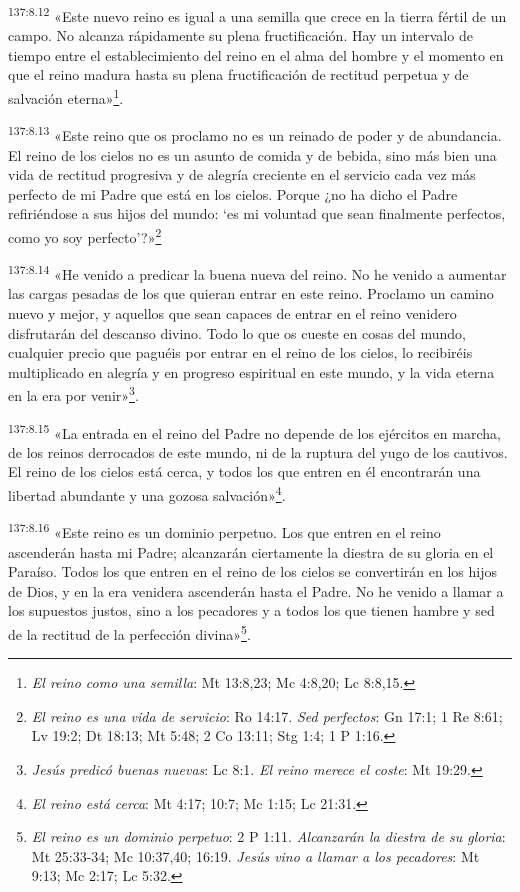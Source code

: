 \par 
\textsuperscript{137:8.12} «Este nuevo reino es igual a una semilla que crece en la tierra fértil de un campo. No alcanza rápidamente su plena fructificación. Hay un intervalo de tiempo entre el establecimiento del reino en el alma del hombre y el momento en que el reino madura hasta su plena fructificación de rectitud perpetua y de salvación eterna»\footnote{\textit{El reino como una semilla}: Mt 13:8,23; Mc 4:8,20; Lc 8:8,15.}.

\par 
\textsuperscript{137:8.13} «Este reino que os proclamo no es un reinado de poder y de abundancia. El reino de los cielos no es un asunto de comida y de bebida, sino más bien una vida de rectitud progresiva y de alegría creciente en el servicio cada vez más perfecto de mi Padre que está en los cielos. Porque ¿no ha dicho el Padre refiriéndose a sus hijos del mundo: `es mi voluntad que sean finalmente perfectos, como yo soy perfecto'?»\footnote{\textit{El reino es una vida de servicio}: Ro 14:17. \textit{Sed perfectos}: Gn 17:1; 1 Re 8:61; Lv 19:2; Dt 18:13; Mt 5:48; 2 Co 13:11; Stg 1:4; 1 P 1:16.}

\par 
\textsuperscript{137:8.14} «He venido a predicar la buena nueva del reino. No he venido a aumentar las cargas pesadas de los que quieran entrar en este reino. Proclamo un camino nuevo y mejor, y aquellos que sean capaces de entrar en el reino venidero disfrutarán del descanso divino. Todo lo que os cueste en cosas del mundo, cualquier precio que paguéis por entrar en el reino de los cielos, lo recibiréis multiplicado en alegría y en progreso espiritual en este mundo, y la vida eterna en la era por venir»\footnote{\textit{Jesús predicó buenas nuevas}: Lc 8:1. \textit{El reino merece el coste}: Mt 19:29.}.

\par 
\textsuperscript{137:8.15} «La entrada en el reino del Padre no depende de los ejércitos en marcha, de los reinos derrocados de este mundo, ni de la ruptura del yugo de los cautivos. El reino de los cielos está cerca, y todos los que entren en él encontrarán una libertad abundante y una gozosa salvación»\footnote{\textit{El reino está cerca}: Mt 4:17; 10:7; Mc 1:15; Lc 21:31.}.

\par 
\textsuperscript{137:8.16} «Este reino es un dominio perpetuo. Los que entren en el reino ascenderán hasta mi Padre; alcanzarán ciertamente la diestra de su gloria en el Paraíso. Todos los que entren en el reino de los cielos se convertirán en los hijos de Dios, y en la era venidera ascenderán hasta el Padre. No he venido a llamar a los supuestos justos, sino a los pecadores y a todos los que tienen hambre y sed de la rectitud de la perfección divina»\footnote{\textit{El reino es un dominio perpetuo}: 2 P 1:11. \textit{Alcanzarán la diestra de su gloria}: Mt 25:33-34; Mc 10:37,40; 16:19. \textit{Jesús vino a llamar a los pecadores}: Mt 9:13; Mc 2:17; Lc 5:32.}.

